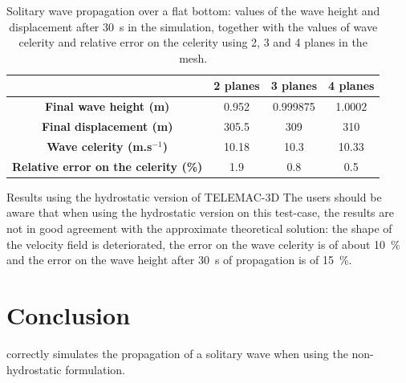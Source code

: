 \begin{table}[H]
\caption{Solitary wave propagation over a flat bottom:
values of the wave height and displacement after 30~s in the simulation,
together with the values of wave celerity and relative error on the celerity
using 2, 3 and 4 planes in the mesh.}
\label{tab:solit_celerity}
\begin{center}\begin{tabular}{|c|c|c|c|}
\hline
~ & \textbf{2 planes} & \textbf{3 planes} & \textbf{4 planes}\\
\hline
\textbf{Final wave height (m)} & 0.952 & 0.999875 & 1.0002 \\
\hline
\textbf{Final displacement (m)} & 305.5 & 309 & 310 \\
\hline
\textbf{Wave celerity (m.s$^{-1}$)} & 10.18 & 10.3 & 10.33 \\
\hline
\textbf{Relative error on the celerity (\%)} & 1.9 & 0.8 & 0.5 \\
\hline
\end{tabular}\end{center}
\end{table}
\begin{WarningBlock}{Results using the hydrostatic version of TELEMAC-3D}
The users should be aware that when using the hydrostatic version on this test-case, the
results are not in good agreement with the approximate theoretical solution: the shape of the velocity field
is deteriorated, the error on the wave celerity is of about 10~\% and the error on the wave height after 30~s
of propagation is of 15~\%.
\end{WarningBlock}
%
\section{Conclusion}
%
 correctly simulates the propagation of a solitary wave when using the non-hydrostatic formulation.
